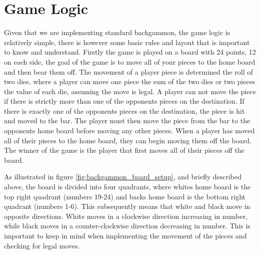 \documentclass[ twoside,openright,titlepage,numbers=noenddot,headinclude,%
                footinclude=true,cleardoublepage=empty,abstractoff, %
                BCOR=5mm,paper=a4,fontsize=11pt,%
                ngerman,american,%
                ]{scrreprt}
\begin{document}
\section{Game Logic}
Given that we are implementing standard backgammon, the game logic is relatively simple, there is however some basic rules and layout that is important to know and understand. Firstly the game is played on a board with 24 points, 12 on each side, the goal of the game is to move all of your pieces to the home board and then bear them off. The movement of a player piece is determined the roll of two dies, where a player can move one piece the sum of the two dies or two pieces the value of each die, assuming the move is legal. A player can not move the piece if there is strictly more than one of the opponents pieces on the destination. If there is exactly one of the opponents pieces on the destination, the piece is hit and moved to the bar. The player must then move the piece from the bar to the opponents home board before moving any other pieces. When a player has moved all of their pieces to the home board, they can begin moving them off the board. The winner of the game is the player that first moves all of their pieces off the board.

As illustrated in figure \ref{fig:backgammon_board_setup}, and briefly described above, the board is divided into four quadrants, where whites home board is the top right quadrant (numbers 19-24) and backs home board is the bottom right quadrant (numbers 1-6). This subsequently means that white and black move in opposite directions. White moves in a clockwise direction increasing in number, while black moves in a counter-clockwise direction decreasing in number. This is important to keep in mind when implementing the movement of the pieces and checking for legal moves.
\end{document}
